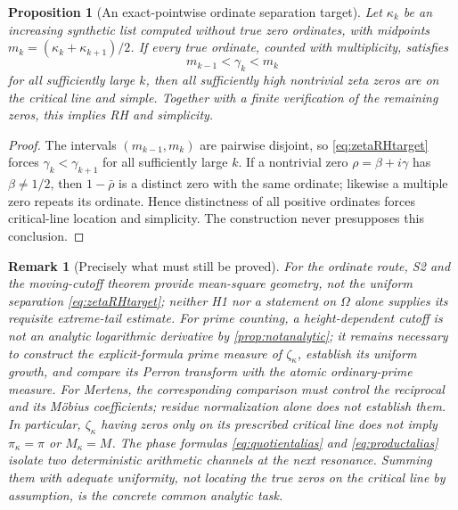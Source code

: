 \documentclass[11pt,reqno]{amsart}
\numberwithin{equation}{section}
\newtheorem{proposition}[theorem]{Proposition}
\newtheorem{remark}[theorem]{Remark}
\begin{document}
\begin{proposition}[An exact-pointwise ordinate separation target]
\label{prop:zetaRHtarget}
Let $\kappa_k$ be an increasing synthetic list computed without
true zero ordinates, with midpoints
$m_k=(\kappa_k+\kappa_{k+1})/2$. If every true ordinate,
counted with multiplicity, satisfies
\begin{equation}\label{eq:zetaRHtarget}
m_{k-1}<\gamma_k<m_k
\end{equation}
for all sufficiently large $k$, then all sufficiently high
nontrivial zeta zeros are on the critical line and simple.
Together with a finite verification of the remaining zeros,
this implies RH and simplicity.
\end{proposition}
\begin{proof}
The intervals $(m_{k-1},m_k)$ are pairwise disjoint, so
\eqref{eq:zetaRHtarget} forces
$\gamma_k<\gamma_{k+1}$ for all sufficiently large $k$.
If a nontrivial zero $\rho=\beta+i\gamma$ has
$\beta\ne1/2$, then $1-\bar\rho$ is a distinct zero
with the same ordinate; likewise a multiple zero repeats its
ordinate. Hence distinctness of all positive ordinates forces
critical-line location and simplicity. The construction never
presupposes this conclusion.
\end{proof}

\begin{remark}[Precisely what must still be proved]
\label{rem:unresolvedbridges}
For the ordinate route, S2 and the moving-cutoff theorem provide
mean-square geometry, not the uniform separation
\eqref{eq:zetaRHtarget}; neither H1 nor a statement on $\Omega$
alone supplies its requisite extreme-tail estimate.
For prime counting, a height-dependent cutoff is not an
analytic logarithmic derivative by \cref{prop:notanalytic};
it remains necessary to construct the explicit-formula prime
measure of $\zeta_\kappa$, establish its uniform growth, and
compare its Perron transform with the \emph{atomic ordinary-prime}
measure. For Mertens, the corresponding comparison must control
the reciprocal and its Möbius coefficients; residue normalization
alone does not establish them. In particular,
$\zeta_\kappa$ having zeros only on its prescribed critical
line does not imply $\pi_\kappa=\pi$ or $M_\kappa=M$.
The phase formulas \eqref{eq:quotientalias} and
\eqref{eq:productalias} isolate two deterministic arithmetic
channels at the next resonance. Summing them with adequate
uniformity, not locating the true zeros on the critical line
by assumption, is the concrete common analytic task.
\end{remark}
\end{document}

